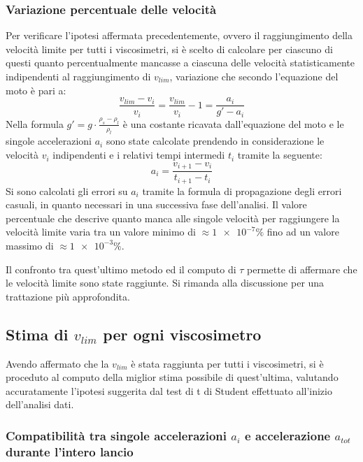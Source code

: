 \documentclass[a4paper,11pt,oneside]{article}
\begin{document}
\subsubsection*{Variazione percentuale delle velocità}
Per verificare l'ipotesi affermata precedentemente, ovvero il raggiungimento della velocità limite per tutti i viscosimetri, si è scelto di calcolare per ciascuno di questi quanto percentualmente mancasse a ciascuna delle velocità statisticamente indipendenti al raggiungimento di $v_{lim}$, variazione  che secondo l'equazione del moto è pari a:
\begin{equation*}
    \frac{v_{lim} - v_{i}}{v_{i}}=\frac{v_{lim}}{v_i}-1=\frac{a_i}{g' - a_i}
\end{equation*}
Nella formula $g'=g\cdot\frac{\rho_s-\rho_l}{\rho_l}$ è una costante ricavata dall'equazione del moto e le singole accelerazioni $a_i$ sono state calcolate prendendo in considerazione le velocità $v_{i}$ indipendenti e i relativi tempi intermedi $t_{i}$ tramite la seguente:
\begin{equation*}
    a_i=\frac{v_{i+1}-v_i}{t_{i+1}-t_{i}}
\end{equation*}
Si sono calcolati gli errori su $a_{i}$ tramite la formula di propagazione degli errori casuali, in quanto necessari in una successiva fase dell'analisi.\newline
Il valore percentuale che descrive quanto manca alle singole velocità per raggiungere la velocità limite varia tra un valore minimo di $\approx\num{1e-7}\%$ fino ad un valore massimo di $\approx\num{1e-3}\%$. 

Il confronto tra quest'ultimo metodo ed il computo di $\tau$ permette di affermare che le velocità limite sono state raggiunte. Si rimanda alla discussione per una trattazione più approfondita.

\subsection{Stima di $v_{lim}$ per ogni viscosimetro}
Avendo affermato che la $v_{lim}$ è stata raggiunta per tutti i viscosimetri, si è proceduto al computo della miglior stima possibile di quest'ultima, valutando accuratamente l'ipotesi suggerita dal test di t di Student effettuato all'inizio dell'analisi dati.


\subsubsection*{Compatibilità tra singole accelerazioni $a_i$ e accelerazione $a_{tot}$ durante l'intero lancio}
\end{document}
